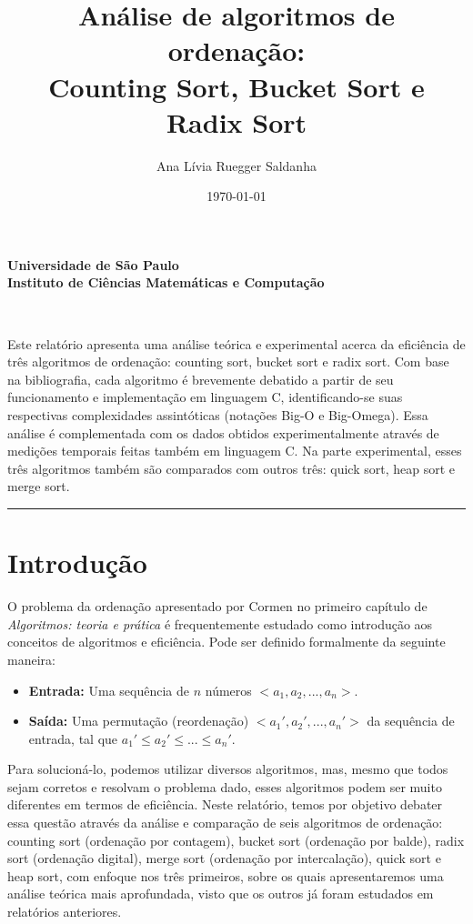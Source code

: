 \documentclass[fontsize=10pt]{article}
\title{\Large{Análise de algoritmos de ordenação: \\ [-6pt] Counting Sort, Bucket Sort e Radix Sort} \\ [10pt]}
\author{Ana Lívia Ruegger Saldanha}
\date{\today}
\makeatletter
\renewenvironment{abstract} %
 {\small
  \begin{center}
  \bfseries \abstractname\vspace{-.5em}\vspace{0pt}
  \end{center}
  \list{}{%
    \setlength{\leftmargin}{0mm}
    \setlength{\rightmargin}{\leftmargin}%
  }
  \item\relax}
 {\endlist}
\renewcommand{\maketitle}{\bgroup\setlength{\parindent}{0pt}%
\begin{center}
    \textbf{
      Universidade de São Paulo\\
      Instituto de Ciências Matemáticas e Computação
    }
\end{center}
\begin{center}
  \textbf{\@title}
  \@author\\
  [3pt] 
  \@date
\end{center}\egroup
}
\makeatother
\begin{document}
\maketitle


\begin{abstract}
    Este relatório apresenta uma análise teórica e experimental acerca da eficiência de três algoritmos de ordenação: counting sort, bucket sort e radix sort. Com base na bibliografia, cada algoritmo é brevemente debatido a partir de seu funcionamento e implementação em linguagem C, identificando-se suas respectivas complexidades assintóticas (notações Big-O e Big-Omega). Essa análise é complementada com os dados obtidos experimentalmente através de medições temporais feitas também em linguagem C. Na parte experimental, esses três algoritmos também são comparados com outros três: quick sort, heap sort e merge sort.
    
\end{abstract}

\rule{\linewidth}{0.5pt}

\section{Introdução}
    
    \quad O problema da ordenação apresentado por Cormen no primeiro capítulo de \textit{Algoritmos: teoria e prática} \cite{cormen} é frequentemente estudado como introdução aos conceitos de algoritmos e eficiência. Pode ser definido formalmente da seguinte maneira:
    
    \begin{itemize}
        \item \textbf{Entrada:} Uma sequência de $n$ números $<a_1, a_2, ..., a_n>$.
        \item \textbf{Saída:} Uma permutação (reordenação) $<a_1', a_2', ..., a_n'>$ da sequência de entrada, tal que $a_1' \leq a_2' \leq ... \leq a_n'$.
    \end{itemize}
    
    \quad Para solucioná-lo, podemos utilizar diversos algoritmos, mas, mesmo que todos sejam corretos e resolvam o problema dado, esses algoritmos podem ser muito diferentes em termos de eficiência. Neste relatório, temos por objetivo debater essa questão através da análise e comparação de seis algoritmos de ordenação: counting sort (ordenação por contagem), bucket sort (ordenação por balde), radix sort (ordenação digital), merge sort (ordenação por intercalação), quick sort e heap sort, com enfoque nos três primeiros, sobre os quais apresentaremos uma análise teórica mais aprofundada, visto que os outros já foram estudados em relatórios anteriores\cite{relatorio1}\cite{relatorio2}. 
    
\end{document}
